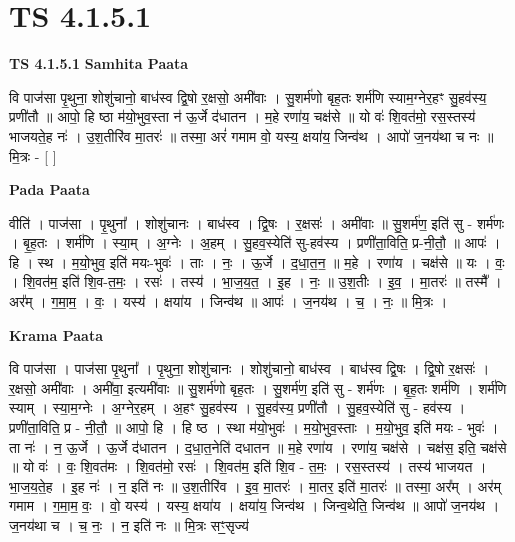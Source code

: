 \documentclass[17pt]{extarticle}
\begin{document}
\section{ TS 4.1.5.1 }

\textbf{TS 4.1.5.1 } \newline
\textbf{Samhita Paata} \newline

वि पाज॑सा पृ॒थुना॒ शोशु॑चानो॒ बाध॑स्व द्वि॒षो र॒क्षसो॒ अमी॑वाः । सु॒शर्म॑णो बृह॒तः शर्म॑णि स्याम॒ग्नेर॒हꣳ सु॒हव॑स्य॒ प्रणी॑तौ ॥ आपो॒ हि ष्ठा म॑यो॒भुव॒स्ता न॑ ऊ॒र्जे द॑धातन । म॒हे रणा॑य॒ चक्ष॑से ॥ यो वः॑ शि॒वत॑मो॒ रस॒स्तस्य॑ भाजयते॒ह नः॑ । उ॒श॒तीरि॑व मा॒तरः॑ ॥ तस्मा॒ अरं॑ गमाम वो॒ यस्य॒ क्षया॑य॒ जिन्व॑थ । आपो॑ ज॒नय॑था च नः ॥ मि॒त्रः - [  ] \newline

\textbf{Pada Paata} \newline

वीति॑ । पाज॑सा । पृ॒थुना᳚ । शोशु॑चानः । बाध॑स्व । द्वि॒षः । र॒क्षसः॑ । अमी॑वाः ॥ सु॒शर्म॑ण॒ इति॑ सु - शर्म॑णः । बृ॒ह॒तः । शर्म॑णि । स्या॒म् । अ॒ग्नेः । अ॒हम् । सु॒हव॒स्येति॑ सु-हव॑स्य । प्रणी॑ता॒विति॒ प्र-नी॒तौ॒ ॥ आपः॑ । हि । स्थ । म॒यो॒भुव॒ इति॑ मयः-भुवः॑ । ताः । नः॒ । ऊ॒र्जे । द॒धा॒त॒न॒ ॥ म॒हे । रणा॑य । चक्ष॑से ॥ यः । वः॒ । शि॒वत॑म॒ इति॑ शि॒व-त॒मः॒ । रसः॑ । तस्य॑ । भा॒ज॒य॒त॒ । इ॒ह । नः॒ ॥ उ॒श॒तीः । इ॒व॒ । मा॒तरः॑ ॥ तस्मै᳚ । अर᳚म् । ग॒मा॒म॒ । वः॒ । यस्य॑ । क्षया॑य । जिन्व॑थ ॥ आपः॑ । ज॒नय॑थ । च॒ । नः॒ ॥ मि॒त्रः ।  \newline


\textbf{Krama Paata} \newline

वि पाज॑सा । पाज॑सा पृ॒थुना᳚ । पृ॒थुना॒ शोशु॑चानः । शोशु॑चानो॒ बाध॑स्व । बाध॑स्व द्वि॒षः । द्वि॒षो र॒क्षसः॑ । र॒क्षसो॒ अमी॑वाः । अमी॑वा॒ इत्यमी॑वाः ॥ सु॒शर्म॑णो बृह॒तः । सु॒शर्म॑ण॒ इति॑ सु - शर्म॑णः । बृ॒ह॒तः शर्म॑णि । शर्म॑णि स्याम् । स्या॒म॒ग्नेः । अ॒ग्नेर॒हम् । अ॒हꣳ सु॒हव॑स्य । सु॒हव॑स्य॒ प्रणी॑तौ । सु॒हव॒स्येति॑ सु - हव॑स्य । प्रणी॑ता॒विति॒ प्र - नी॒तौ॒ ॥ आपो॒ हि । हि ष्ठ । स्था म॑यो॒भुवः॑ । म॒यो॒भुव॒स्ताः । म॒यो॒भुव॒ इति॑ मयः - भुवः॑ । ता नः॑ । न॒ ऊ॒र्जे । ऊ॒र्जे द॑धातन । द॒धा॒त॒नेति॑ दधातन ॥ म॒हे रणा॑य । रणा॑य॒ चक्ष॑से । चक्ष॑स॒ इति॒ चक्ष॑से ॥ यो वः॑ । वः॒ शि॒वत॑मः । शि॒वत॑मो॒ रसः॑ । शि॒वत॑म॒ इति॑ शि॒व - त॒मः॒ । रस॒स्तस्य॑ । तस्य॑ भाजयत । भा॒ज॒य॒ते॒ह । इ॒ह नः॑ । न॒ इति॑ नः ॥ उ॒श॒तीरि॑व । इ॒व॒ मा॒तरः॑ । मा॒तर॒ इति॑ मा॒तरः॑ ॥ तस्मा॒ अर᳚म् । अर॑म् गमाम । ग॒मा॒म॒ वः॒ । वो॒ यस्य॑ । यस्य॒ क्षया॑य । क्षया॑य॒ जिन्व॑थ । जिन्व॒थेति॒ जिन्व॑थ ॥ आपो॑ ज॒नय॑थ । ज॒नय॑था च । च॒ नः॒ । न॒ इति॑ नः ॥ मि॒त्रः सꣳ॒॒सृज्य॑ \newline
\end{document}
